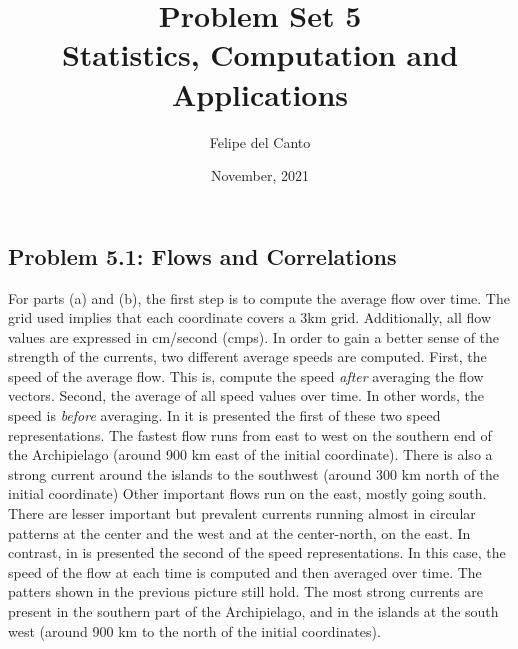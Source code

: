 \documentclass[11pt, english]{article}
\title{\bf Problem Set 5 \\ Statistics, Computation and
Applications\\[-1ex]}
\author{Felipe del Canto}
\date{November, 2021}
\begin{document}
    
\maketitle
   
\begin{multicols}{2}

\section*{Problem 5.1: Flows and Correlations}

For parts (a) and (b), the first step is to compute the average flow over time. The grid used implies that each coordinate covers a 3km grid. Additionally, all flow values are expressed in cm/second (cmps). In order to gain a better sense of the strength of the currents, two different average speeds are computed. First, the speed of the average flow. This is, compute the speed \textit{after} averaging the flow vectors. Second, the average of all speed values over time. In other words, the speed is \textit{before} averaging. In  it is presented the first of these two speed representations. The fastest flow runs from east to west on the southern end of the Archipielago (around 900 km east of the initial coordinate). There is also a strong current around the islands to the southwest (around 300 km north of the initial coordinate) Other important flows run on the east, mostly going south. There are lesser important but prevalent currents running almost in circular patterns at the center and the west and at the center-north, on the east. In contrast, in  is presented the second of the speed representations. In this case, the speed of the flow at each time is computed and then averaged over time. The patters shown in the previous picture still hold. The most strong currents are present in the southern part of the Archipielago, and in the islands at the south west (around 900 km to the north of the initial coordinates).


\end{multicols}
\end{document}
